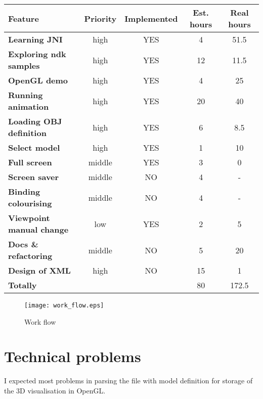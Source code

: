 \begin{tabular}{| l || c | c |  c | c |}
\hline
{\bf Feature} & {\bf Priority} & {\bf Implemented} & {\bf Est. hours} & {\bf Real hours}\\
\hline
\hline
\textbf{Learning JNI} & high & YES &                 4 & 51.5\\
\textbf{Exploring ndk samples} & high & YES &       12 & 11.5\\
\textbf{OpenGL demo} & high & YES &                  4 & 25\\
\textbf{Running animation} & high & YES &           20 & 40\\
\textbf{Loading OBJ definition} & high & YES &       6 &  8.5\\
\textbf{Select model} & high & YES &                 1 & 10\\
\textbf{Full screen} & middle & YES &                3 &  0\\
\textbf{Screen saver} & middle & NO &                4 &  -\\
\textbf{Binding colourising} & middle & NO &         4 & -\\
\textbf{Viewpoint manual change}  & low & YES &       2 & 5\\
\textbf{Docs \& refactoring} & middle & NO &         5 & 20\\
\textbf{Design of XML} & high & NO &                15 & 1\\
\hline
\textbf{Totally} & & &                              80 & 172.5 \\
\hline
\end{tabular}

\begin{figure}
\texttt{[image: work\_flow.eps]}
\label{work_flow}
\caption{Work flow}
\end{figure}


\section*{Technical problems} %
\label{sec:problems}
I expected most problems in parsing the file with model definition
for storage of the 3D visualisation in OpenGL.

